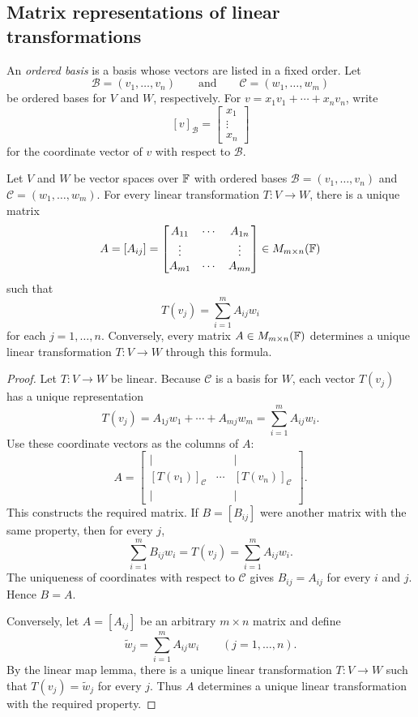 \subsection{Matrix representations of linear transformations}

An \emph{ordered basis} is a basis whose vectors are listed in a fixed
order. Let
\[
  \mathcal B=(v_1,\ldots,v_n)
  \qquad\text{and}\qquad
  \mathcal C=(w_1,\ldots,w_m)
\]
be ordered bases for $V$ and $W$, respectively. For
$v=x_1v_1+\cdots+x_nv_n$, write
\[
  [v]_{\mathcal B}
  =\begin{bmatrix}x_1\\ \vdots\\ x_n\end{bmatrix}
\]
for the coordinate vector of $v$ with respect to $\mathcal B$.

\begin{theorem}
  \label{thm:matrix-representation}
  Let $V$ and $W$ be vector spaces over $\mathbb{F}$ with ordered bases
  $\mathcal B=(v_1,\ldots,v_n)$ and
  $\mathcal C=(w_1,\ldots,w_m)$. For every linear transformation
  $T\colon V\to W$, there is a unique matrix
  \[
    A=[A_{ij}]
    =\begin{bmatrix}
      A_{11} & \cdots & A_{1n} \\
      \vdots &        & \vdots \\
      A_{m1} & \cdots & A_{mn}
    \end{bmatrix}
    \in M_{m\times n}(\mathbb{F})
  \]
  such that
  \[
    T(v_j)=\sum_{i=1}^m A_{ij}w_i
  \]
  for each $j=1,\ldots,n$. Conversely, every matrix
  $A\in M_{m\times n}(\mathbb{F})$ determines a unique linear transformation
  $T\colon V\to W$ through this formula.
\end{theorem}

\begin{proof}
  Let $T\colon V\to W$ be linear. Because $\mathcal C$ is a basis for
  $W$, each vector $T(v_j)$ has a unique representation
  \[
    T(v_j)=A_{1j}w_1+\cdots+A_{mj}w_m
           =\sum_{i=1}^m A_{ij}w_i.
  \]
  Use these coordinate vectors as the columns of $A$:
  \[
    A
    =\begin{bmatrix}
      \vert &        & \vert \\
      [T(v_1)]_{\mathcal C} & \cdots & [T(v_n)]_{\mathcal C} \\
      \vert &        & \vert
    \end{bmatrix}.
  \]
  This constructs the required matrix. If $B=[B_{ij}]$ were another
  matrix with the same property, then for every $j$,
  \[
    \sum_{i=1}^m B_{ij}w_i
    =T(v_j)
    =\sum_{i=1}^m A_{ij}w_i.
  \]
  The uniqueness of coordinates with respect to $\mathcal C$ gives
  $B_{ij}=A_{ij}$ for every $i$ and $j$. Hence $B=A$.

  Conversely, let $A=[A_{ij}]$ be an arbitrary $m\times n$ matrix and
  define
  \[
    \widetilde w_j=\sum_{i=1}^m A_{ij}w_i
    \qquad (j=1,\ldots,n).
  \]
  By the linear map lemma, there is a unique linear transformation
  $T\colon V\to W$ such that $T(v_j)=\widetilde w_j$ for every $j$.
  Thus $A$ determines a unique linear transformation with the required
  property.
\end{proof}

